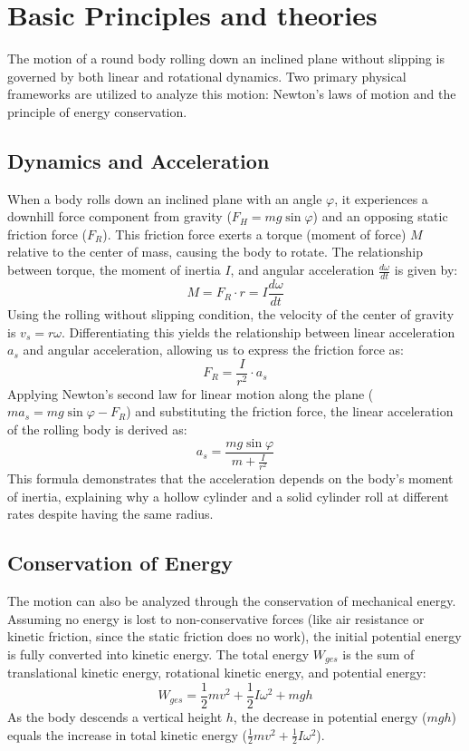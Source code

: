 \documentclass[12pt,a4paper,titlepage]{scrartcl}
\numberwithin{equation}{section}
\numberwithin{table}{section}
\numberwithin{figure}{section}
\begin{document}
\section{Basic Principles and theories}\label{sec:Grundlagen}
The motion of a round body rolling down an inclined plane without slipping is governed by both linear and rotational dynamics. Two primary physical frameworks are utilized to analyze this motion: Newton's laws of motion and the principle of energy conservation.

\subsection{Dynamics and Acceleration}
When a body rolls down an inclined plane with an angle $\varphi$, it experiences a downhill force component from gravity ($F_H = mg \sin\varphi$) and an opposing static friction force ($F_R$). This friction force exerts a torque (moment of force) $M$ relative to the center of mass, causing the body to rotate. The relationship between torque, the moment of inertia $I$, and angular acceleration $\frac{d\omega}{dt}$ is given by:
\begin{equation}
    M = F_R \cdot r = I \frac{d\omega}{dt}
\end{equation}
Using the rolling without slipping condition, the velocity of the center of gravity is $v_s = r\omega$. Differentiating this yields the relationship between linear acceleration $a_s$ and angular acceleration, allowing us to express the friction force as:
\begin{equation}
    F_R = \frac{I}{r^2} \cdot a_s
\end{equation}
Applying Newton's second law for linear motion along the plane ($m a_s = mg \sin\varphi - F_R$) and substituting the friction force, the linear acceleration of the rolling body is derived as:
\begin{equation}
    a_s = \frac{mg \sin\varphi}{m + \frac{I}{r^2}}\label{eq:acceleration_formula}
\end{equation}
This formula demonstrates that the acceleration depends on the body's moment of inertia, explaining why a hollow cylinder and a solid cylinder roll at different rates despite having the same radius.\cite{PAPskript}

\subsection{Conservation of Energy}
The motion can also be analyzed through the conservation of mechanical energy. Assuming no energy is lost to non-conservative forces (like air resistance or kinetic friction, since the static friction does no work), the initial potential energy is fully converted into kinetic energy. The total energy $W_{ges}$ is the sum of translational kinetic energy, rotational kinetic energy, and potential energy:
\begin{equation}
    W_{ges} = \frac{1}{2}mv^2 + \frac{1}{2}I\omega^2 + mgh
\end{equation}
As the body descends a vertical height $h$, the decrease in potential energy ($mgh$) equals the increase in total kinetic energy ($\frac{1}{2}mv^2 + \frac{1}{2}I\omega^2$).
\end{document}
